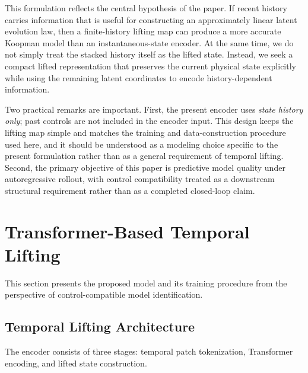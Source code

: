 \documentclass[journal]{IEEEtran}
\begin{document}
This formulation reflects the central hypothesis of the paper. If recent history carries information that is useful for constructing an approximately linear latent evolution law, then a finite-history lifting map can produce a more accurate Koopman model than an instantaneous-state encoder. At the same time, we do not simply treat the stacked history itself as the lifted state. Instead, we seek a compact lifted representation that preserves the current physical state explicitly while using the remaining latent coordinates to encode history-dependent information.

Two practical remarks are important. First, the present encoder uses \emph{state history only}; past controls are not included in the encoder input. This design keeps the lifting map simple and matches the training and data-construction procedure used here, and it should be understood as a modeling choice specific to the present formulation rather than as a general requirement of temporal lifting. Second, the primary objective of this paper is predictive model quality under autoregressive rollout, with control compatibility treated as a downstream structural requirement rather than as a completed closed-loop claim.

\section{Transformer-Based Temporal Lifting}
\label{sec:methodology}

This section presents the proposed model and its training procedure from the perspective of control-compatible model identification.

\subsection{Temporal Lifting Architecture}
\label{sec:temporal_lifting}

The encoder consists of three stages: temporal patch tokenization, Transformer encoding, and lifted state construction.
\end{document}
